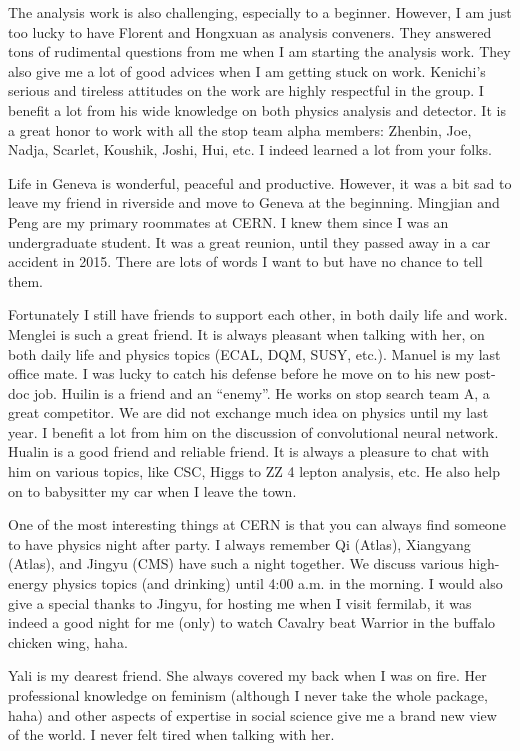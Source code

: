 \documentclass[oneside,final,letterpaper]{ucr}
\begin{document}
\begin{frontmatter}
\begin{acknowledgements}
The analysis work is also challenging, especially to a beginner. However, I am just too lucky to have Florent and Hongxuan as analysis conveners. They answered tons of rudimental questions from me when I am starting the analysis work. They also give me a lot of good advices when I am getting stuck on work. Kenichi’s serious and tireless attitudes on the work are highly respectful in the group. I benefit a lot from his wide knowledge on both physics analysis and detector. It is a great honor to work with all the stop team alpha members: Zhenbin, Joe, Nadja, Scarlet, Koushik, Joshi, Hui, etc. I indeed learned a lot from your folks. 

Life in Geneva is wonderful, peaceful and productive. However, it was a bit sad to leave my friend in riverside and move to Geneva at the beginning. Mingjian and Peng are my primary roommates at CERN. I knew them since I was an undergraduate student. It was a great reunion, until they passed away in a car accident in 2015. There are lots of words I want to but have no chance to tell them. 

Fortunately I still have friends to support each other, in both daily life and work. Menglei is such a great friend. It is always pleasant when talking with her, on both daily life and physics topics (ECAL, DQM, SUSY, etc.). Manuel is my last office mate. I was lucky to catch his defense before he move on to his new post-doc job. Huilin is a friend and an “enemy”. He works on stop search team A, a great competitor. We are did not exchange much idea on physics until my last year. I benefit a lot from him on the discussion of convolutional neural network. Hualin is a good friend and reliable friend. It is always a pleasure to chat with him on various topics, like CSC, Higgs to ZZ 4 lepton analysis, etc. He also help on to babysitter my car when I leave the town. 

One of the most interesting things at CERN is that you can always find someone to have physics night after party. I always remember Qi (Atlas), Xiangyang (Atlas), and Jingyu (CMS) have such a night together. We discuss various high-energy physics topics (and drinking) until 4:00 a.m. in the morning. I would also give a special thanks to Jingyu, for hosting me when I visit fermilab, it was indeed a good night for me (only) to watch Cavalry beat Warrior in the buffalo chicken wing, haha. 

Yali is my dearest friend. She always covered my back when I was on fire. Her professional knowledge on feminism (although I never take the whole package, haha) and other aspects of expertise in social science give me a brand new view of the world. I never felt tired when talking with her. 


\end{acknowledgements}
\end{frontmatter}
\end{document}
